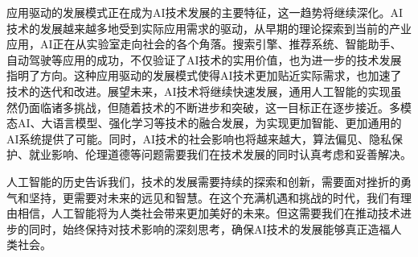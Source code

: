 应用驱动的发展模式正在成为AI技术发展的主要特征，这一趋势将继续深化。AI技术的发展越来越多地受到实际应用需求的驱动，从早期的理论探索到当前的产业应用，AI正在从实验室走向社会的各个角落。搜索引擎、推荐系统、智能助手、自动驾驶等应用的成功，不仅验证了AI技术的实用价值，也为进一步的技术发展指明了方向。这种应用驱动的发展模式使得AI技术更加贴近实际需求，也加速了技术的迭代和改进。展望未来，AI技术将继续快速发展，通用人工智能的实现虽然仍面临诸多挑战，但随着技术的不断进步和突破，这一目标正在逐步接近。多模态AI、大语言模型、强化学习等技术的融合发展，为实现更加智能、更加通用的AI系统提供了可能。同时，AI技术的社会影响也将越来越大，算法偏见、隐私保护、就业影响、伦理道德等问题需要我们在技术发展的同时认真考虑和妥善解决。

人工智能的历史告诉我们，技术的发展需要持续的探索和创新，需要面对挫折的勇气和坚持，更需要对未来的远见和智慧。在这个充满机遇和挑战的时代，我们有理由相信，人工智能将为人类社会带来更加美好的未来。但这需要我们在推动技术进步的同时，始终保持对技术影响的深刻思考，确保AI技术的发展能够真正造福人类社会。

\nocite{*}
